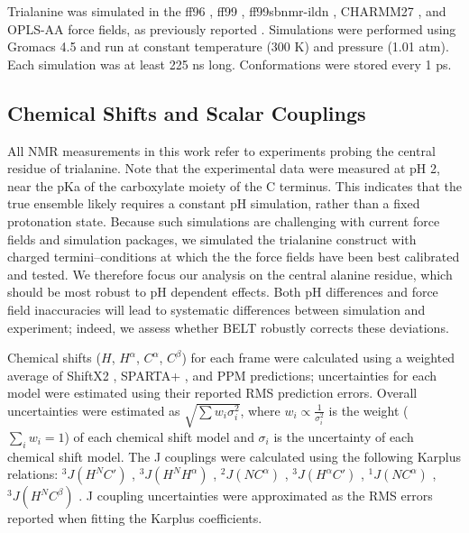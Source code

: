 \documentclass[journal=jacsat,manuscript=article]{achemso}
\begin{document}
Trialanine was simulated in the ff96 \cite{kollman1996}, ff99 \cite{wang2000}, ff99sbnmr-ildn \cite{li2010, Lindorff-Larsen2010}, CHARMM27 \cite{mackerell2004extending,bjelkmar2010implementation}, and OPLS-AA \cite{kaminski2001evaluation} force fields, as previously reported  \cite{beauchamp2012protein}.  Simulations were performed using Gromacs 4.5  \cite{hess2008} and run at constant temperature (300 K) and pressure (1.01 atm).  Each simulation was at least 225 ns long.  Conformations were stored every 1 ps.  

\subsection*{Chemical Shifts and Scalar Couplings}

All NMR measurements in this work refer to experiments  \cite{Graf2007} probing the central residue of trialanine.  Note that the experimental data were measured at pH 2, near the pKa of the carboxylate moiety of the C terminus.  This indicates that the true ensemble likely requires a constant pH simulation, rather than a fixed protonation state.  Because such simulations are challenging with current force fields and simulation packages, we simulated the trialanine construct with charged termini--conditions at which the the force fields have been best calibrated and tested.  We therefore focus our analysis on the central alanine residue, which should be most robust to pH dependent effects.  Both pH differences and force field inaccuracies will lead to systematic differences  between simulation and experiment; indeed, we assess whether BELT robustly corrects these deviations.  

Chemical shifts ($H$, $H^\alpha$, $C^\alpha$, $C^\beta$) for each frame were calculated using a weighted average of ShiftX2 \cite{han2011shiftx2}, SPARTA+  \cite{Shen2010}, and PPM \cite{li2012ppm} predictions; uncertainties for each model were estimated using their reported RMS prediction errors.  Overall uncertainties were estimated as $\sqrt{\sum w_i \sigma_i^2}$, where $w_i \propto \frac{1}{\sigma_i^2}$ is the weight ($\sum_i w_i = 1$) of each chemical shift model and $\sigma_i$ is the uncertainty of each chemical shift model.  The J couplings were calculated using the following Karplus relations: $^3J(H^N C')$  \cite{vogeli2007limits}, $^3J(H^N H^\alpha)$  \cite{vogeli2007limits}, $^2J(N C^\alpha)$  \cite{Graf2007}, $^3J(H^\alpha C')$  \cite{Schmidt1999}, $^1J(N C^\alpha)$  \cite{Graf2007}, $^3J(H^N C^\beta)$  \cite{vogeli2007limits}.  J coupling uncertainties were approximated as the RMS errors reported when fitting the Karplus coefficients.  
\end{document}
